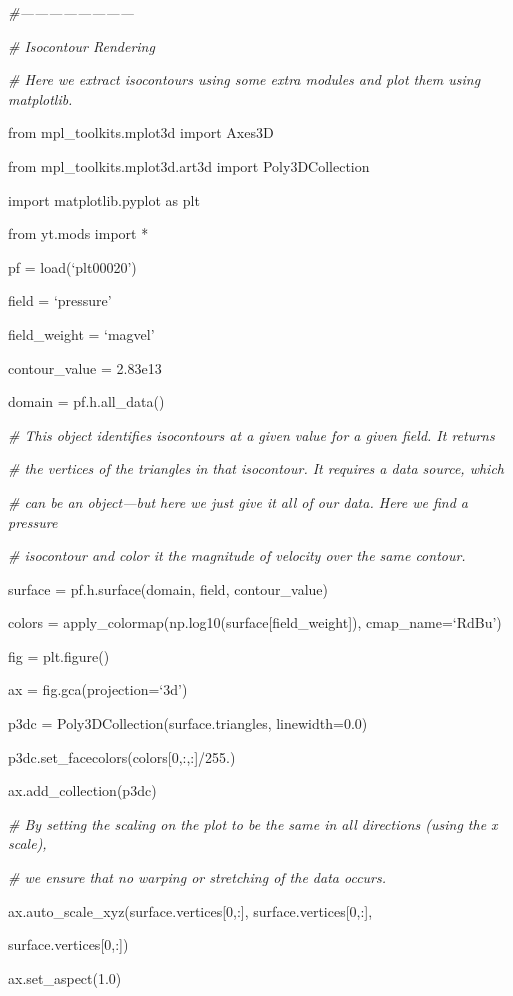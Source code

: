 {\it\#------------------------}

{\it\# Isocontour Rendering}
{\setlength{\parskip}{0pt}

{\it\# Here we extract isocontours using some extra modules and plot them using matplotlib.}

from mpl\_toolkits.mplot3d import Axes3D
}

from mpl\_toolkits.mplot3d.art3d import Poly3DCollection

import matplotlib.pyplot as plt

from yt.mods import *

pf = load(`plt00020')

field = `pressure'

field\_weight = `magvel'

contour\_value = 2.83e13

domain = pf.h.all\_data()

{\it\# This object identifies isocontours at a given value for a given field. It returns}
{\setlength{\parskip}{0pt}

{\it\# the vertices of the triangles in that isocontour. It requires a data source, which}

{\it\# can be an object---but here we just give it all of our data. Here we find a pressure}

{\it\# isocontour and color it the magnitude of velocity over the same contour.}

surface = pf.h.surface(domain, field, contour\_value)
}

colors = apply\_colormap(np.log10(surface[field\_weight]), cmap\_name=`RdBu')

fig = plt.figure()

ax = fig.gca(projection=`3d')

p3dc = Poly3DCollection(surface.triangles, linewidth=0.0)

p3dc.set\_facecolors(colors[0,:,:]/255.)

ax.add\_collection(p3dc)

{\it\# By setting the scaling on the plot to be the same in all directions (using the x scale),}
{\setlength{\parskip}{0pt}

{\it\# we ensure that no warping or stretching of the data occurs.}

ax.auto\_scale\_xyz(surface.vertices[0,:], surface.vertices[0,:],
}

{\setlength{\parindent}{87pt}surface.vertices[0,:])}

ax.set\_aspect(1.0)

